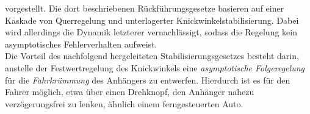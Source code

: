 vorgestellt. Die dort beschriebenen Rückführungsgesetze basieren auf einer Kaskade von Querregelung und unterlagerter Knickwinkelstabilisierung. Dabei wird allerdings die Dynamik letzterer vernachlässigt, sodass die Regelung kein asymptotisches Fehlerverhalten aufweist. \\
Die Vorteil des nachfolgend hergeleiteten Stabilisierungsgesetzes besteht darin, anstelle der Festwertregelung des Knickwinkels eine \emph{asymptotische Folgeregelung} für die \emph{Fahrkrümmung} des Anhängers zu entwerfen. Hierdurch ist es für den Fahrer möglich, etwa über einen Drehknopf, den Anhänger nahezu verzögerungsfrei zu lenken, ähnlich einem ferngesteuerten Auto. \\



